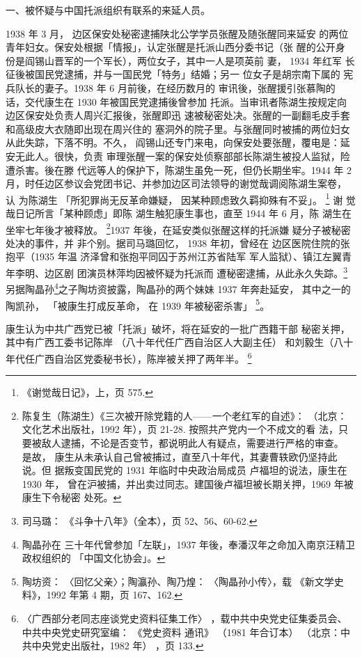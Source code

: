 一、被怀疑与中国托派组织有联系的来延人员。

1938 年 3 月， 边区保安处秘密逮捕陕北公学学员张醒及随张醒同来延安 的两位
青年妇女。保安处根据「情报」，认定张醒是托派山西分委书记（张 醒的公开身
份是阎锡山晋军的一个军长），两位女子，其中一人是项英前 妻， 1934 年红军
长征後被国民党逮捕，并与一国民党「特务」结婚；另一 位女子是胡宗南下属的
宪兵队长的妻子。1938 年 6 月前後，在经历数月的 审讯後，张醒援引张慕陶的
话，交代康生在 1930 年被国民党逮捕後曾参加 托派。当审讯者陈湖生按规定向
边区保安处负责人周兴汇报後，张醒即迅 速被秘密处决。张醒的一副翻毛皮手套
和高级皮大衣随即出现在周兴住的 塞洞外的院子里。与张醒同时被捕的两位妇女
从此失踪，下落不明。不久， 阎锡山还专门来电，向保安处要张醒，覆电是：延
安无此人。很快，负责 审理张醒一案的保安处侦察部部长陈湖生被投人监狱，险
遭杀害。後在滕 代远等人的保护下，陈湖生虽免一死，但仍长期坐牢。1944 年 2
月，时任边区参议会党团书记、并参加边区司法领导的谢觉哉调阅陈湖生案卷，
认 为陈湖生 「所犯罪尚无反革命嫌疑， 因某种顾虑致久羁抑殊有不妥」。
\footnote{《谢觉哉日记》，上，页 575.} 谢 觉哉日记所言「某种顾虑」即陈
湖生触犯康生事也，直至 1944 年 6 月，陈 湖生在坐牢七年後才被释放。
\footnote{陈复生（陈湖生）《三次被开除党籍的人——一个老红军的自述》：
（北京：文化艺术出版社，1992 年），页 21-28. 按照共产党内一个不成文的看
法，只要被敌人逮捕，不论是否变节，都说明此人有疑点，需要进行严格的审查。
是故， 康生从未承认自己曾被捕过，直至八十年代，其妻曹轶欧仍坚持此说。但
据叛变国民党的 1931 年临时中央政治局成员 卢福坦的说法，康生在 1930 年，
曾在沪被捕，并出卖过同志。建国後卢福坦被长期关押，1969 年被康生下令秘密
处死。}1937 年後，在延安类似张醒这样的托派嫌 疑分子被秘密处决的事件，并
非个别。据司马璐回忆， 1938 年初，曾经在 边区医院住院的张抱平（1935 年温
济泽曾和张抱平同囚于苏州江苏省陆军 军人监狱）、镇江左翼青年李明、边区剧
团演员林萍均因被怀疑为托派而 遭秘密逮捕，从此永久失踪。\footnote{司马璐：
《斗争十八年》（全本），页 52、56、60-62.}另据陶晶孙\footnote{陶晶孙在
三十年代曾参加「左联」，1937 年後，奉潘汉年之命加入南京汪精卫政权组织的
「中国文化协会」。}之子陶坊资披露，陶晶孙的两个妹妹 1937 年奔赴延安，
其中之一的陶凯孙， 「被康生打成反革命， 在 1939 年被秘密杀害」
\footnote{陶坊资： 〈回忆父亲〉；陶瀛孙、陶乃煌： 〈陶晶孙小传〉，载
《新文学史料》，1992 年第 4 期，页 167、162.}。

康生认为中共广西党已被「托派」破坏，将在延安的一批广西籍干部
秘密关押，
其中有广西工委书记陈岸
（八十年代任广西自治区人大副主任）
和刘毅生（八十年代任广西自治区党委秘书长），陈岸被关押了两年半。
\footnote{〈广西部分老同志座谈党史资料征集工作〉
，载中共中央党史征集委员会、中共中央党史研究室编：
《党史资料
通讯》
（1981 年合订本）
（北京：中共中央党史出版社，1982 年）
，页 133.}

